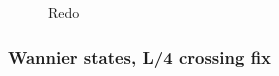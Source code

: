\documentclass[twocolumn,amsmath,longbibliography,amssymb,superscriptaddress]{revtex4-1}
\newcommand{\carlos}[1]{{\color{red} #1}}
\begin{document}
\begin{figure}[h]
\centering
{}
\caption{\carlos{Redo}}
\label{disorder}
\end{figure}

\subsubsection{Wannier states, L/4 crossing fix}
\end{document}
